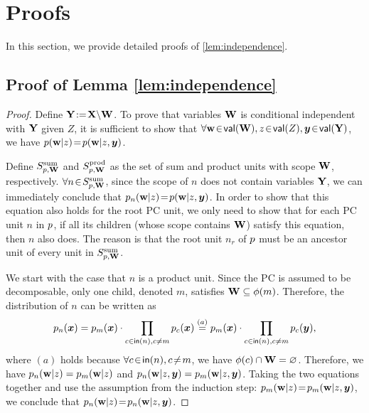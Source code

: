 \documentclass{article} %
\begin{document}
\newpage
\appendix

\section{Proofs}

In this section, we provide detailed proofs of \cref{lem:independence}.

\subsection{Proof of Lemma \ref{lem:independence}}
\label{appx:proof1}

\begin{proof}
Define $\mathbf{Y} \!:=\! \mathbf{X} \backslash \mathbf{W}$. To prove that variables $\mathbf{W}$ is conditional independent with $\mathbf{Y}$ given $Z$, it is sufficient to show that $\forall \mathbf{w} \!\in\! \mathsf{val}(\mathbf{W}), z \!\in\! \mathsf{val}(Z), \boldsymbol{y} \!\in\! \mathsf{val}(\mathbf{Y})$, we have ${p}(\mathbf{w} \vert z) \!=\! {p}(\mathbf{w} \vert z, \boldsymbol{y})$.

Define $S_{{p},\mathbf{W}}^{\mathrm{sum}}$ and $S_{{p},\mathbf{W}}^{\mathrm{prod}}$ as the set of sum and product units with scope $\mathbf{W}$, respectively. $\forall n \!\in\! S_{{p},\mathbf{W}}^{\mathrm{sum}}$, since the scope of $n$ does not contain variables $\mathbf{Y}$, we can immediately conclude that ${p}_{n} (\mathbf{w} \vert z) \!=\! {p}(\mathbf{w} \vert z, \boldsymbol{y})$. In order to show that this equation also holds for the root PC unit, we only need to show that for each PC unit $n$ in ${p}$, if all its children (whose scope contains $\mathbf{W}$) satisfy this equation, then $n$ also does. The reason is that the root unit $n_r$ of ${p}$ must be an ancestor unit of every unit in $S_{{p},\mathbf{W}}^{\mathrm{sum}}$.

We start with the case that $n$ is a product unit. Since the PC is assumed to be decomposable, only one child, denoted $m$, satisfies $\mathbf{W} \subseteq {\phi}(m)$. Therefore, the distribution of $n$ can be written as
    \begin{align*}
        {p}_{n} (\boldsymbol{x}) = {p}_{m} (\boldsymbol{x}) \cdot \prod_{c \in \mathsf{in}(n), c \neq m} {p}_{c} (\boldsymbol{x}) \overset{(a)}{=} {p}_{m} (\boldsymbol{x}) \cdot \prod_{c \in \mathsf{in}(n), c \neq m} {p}_{c} (\boldsymbol{y}),
    \end{align*}
\noindent where $(a)$ holds because $\forall c \!\in\! \mathsf{in}(n), c \!\neq\! m$, we have $\phi(c) \cap \mathbf{W} = \varnothing$. Therefore, we have ${p}_{n} (\mathbf{w} \vert z) = {p}_{m} (\mathbf{w} \vert z)$ and ${p}_{n} (\mathbf{w} \vert z, \boldsymbol{y}) = {p}_{m} (\mathbf{w} \vert z, \boldsymbol{y})$. Taking the two equations together and use the assumption from the induction step: ${p}_{m} (\mathbf{w} \vert z) \!=\! {p}_{m} (\mathbf{w} \vert z, \boldsymbol{y})$, we conclude that ${p}_{n} (\mathbf{w} \vert z) \!=\! {p}_{n} (\mathbf{w} \vert z, \boldsymbol{y})$.


\end{proof}
\end{document}
